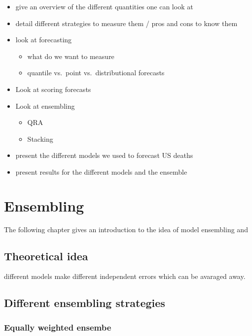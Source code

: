 \documentclass[
]{book}
\providecommand{\tightlist}{%
  \setlength{\itemsep}{0pt}\setlength{\parskip}{0pt}}
\begin{document}
\begin{itemize}
\tightlist
\item
  give an overview of the different quantities one can look at
\item
  detail different strategies to measure them / pros and cons to know them
\item
  look at forecasting

  \begin{itemize}
  \tightlist
  \item
    what do we want to measure
  \item
    quantile vs.~point vs.~distributional forecasts
  \end{itemize}
\item
  Look at scoring forecasts
\item
  Look at ensembling

  \begin{itemize}
  \tightlist
  \item
    QRA
  \item
    Stacking
  \end{itemize}
\item
  present the different models we used to forecast US deaths
\item
  present results for the different models and the ensemble
\end{itemize}

\hypertarget{ensembling}{%
\chapter{Ensembling}\label{ensembling}}

The following chapter gives an introduction to the idea of model ensembling and

\hypertarget{theoretical-idea}{%
\section{Theoretical idea}\label{theoretical-idea}}

different models make different independent errors which can be avaraged away.

\hypertarget{different-ensembling-strategies}{%
\section{Different ensembling strategies}\label{different-ensembling-strategies}}

\hypertarget{equally-weighted-ensembe}{%
\subsection{Equally weighted ensembe}\label{equally-weighted-ensembe}}
\end{document}
